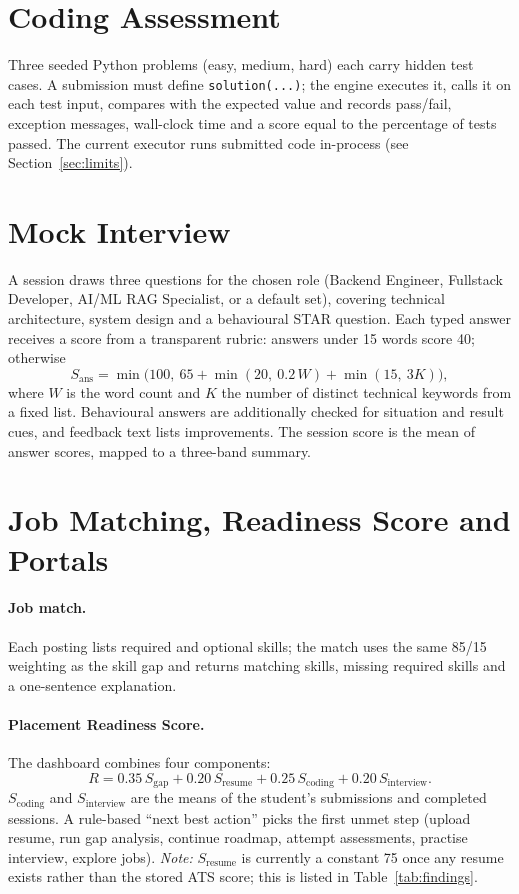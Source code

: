 \documentclass[openany]{tietreport}
\newcommand{\code}[1]{\texttt{\small #1}}
\begin{document}
\section{Coding Assessment}
Three seeded Python problems (easy, medium, hard) each carry hidden test cases. A submission must define \code{solution(...)}; the engine executes it, calls it on each test input, compares with the expected value and records pass/fail, exception messages, wall-clock time and a score equal to the percentage of tests passed. The current executor runs submitted code in-process (see Section~\ref{sec:limits}).

\section{Mock Interview}
A session draws three questions for the chosen role (Backend Engineer, Fullstack Developer, AI/ML RAG Specialist, or a default set), covering technical architecture, system design and a behavioural STAR question. Each typed answer receives a score from a transparent rubric: answers under 15 words score 40; otherwise
\begin{equation}
  S_{\mathrm{ans}} = \min\bigl(100,\ 65 + \min(20,\ 0.2\,W) + \min(15,\ 3K)\bigr),
\end{equation}
where $W$ is the word count and $K$ the number of distinct technical keywords from a fixed list. Behavioural answers are additionally checked for situation and result cues, and feedback text lists improvements. The session score is the mean of answer scores, mapped to a three-band summary.

\section{Job Matching, Readiness Score and Portals}
\paragraph{Job match.} Each posting lists required and optional skills; the match uses the same 85/15 weighting as the skill gap and returns matching skills, missing required skills and a one-sentence explanation.

\paragraph{Placement Readiness Score.} The dashboard combines four components:
\begin{equation}
  R = 0.35\,S_{\mathrm{gap}} + 0.20\,S_{\mathrm{resume}} + 0.25\,S_{\mathrm{coding}} + 0.20\,S_{\mathrm{interview}}.
\end{equation}
$S_{\mathrm{coding}}$ and $S_{\mathrm{interview}}$ are the means of the student's submissions and completed sessions. A rule-based ``next best action'' picks the first unmet step (upload resume, run gap analysis, continue roadmap, attempt assessments, practise interview, explore jobs). \emph{Note:} $S_{\mathrm{resume}}$ is currently a constant 75 once any resume exists rather than the stored ATS score; this is listed in Table~\ref{tab:findings}.
\end{document}
